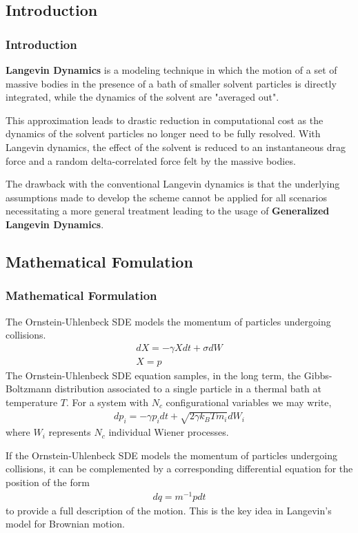 \documentclass[a4paper,8pt]{beamer}
\begin{document}
	\begin{frame}
		\section{Introduction}
		\frametitle{Introduction}
		
		\quad \textbf{Langevin Dynamics} is a modeling technique in which the motion of a set of massive bodies in the presence of a bath of smaller solvent particles is directly integrated, while the dynamics of the solvent are "averaged out".
		
		\quad This approximation leads to drastic reduction in computational cost as the dynamics of the solvent particles no longer need to be fully resolved. With Langevin dynamics, the effect of the solvent is reduced to an instantaneous drag force and a random delta-correlated force felt by the massive bodies.
		
		\quad The drawback with the conventional Langevin dynamics is that the underlying assumptions made to develop the scheme cannot be applied for all scenarios necessitating a more general treatment leading to the usage of \textbf{Generalized Langevin Dynamics}. 
	\end{frame}
	
	\begin{frame}
		\section{Mathematical Fomulation}
		\frametitle{Mathematical Formulation}
		The Ornstein-Uhlenbeck SDE models the momentum of particles undergoing collisions.
		\begin{gather}
			dX = -\gamma X dt + \sigma dW \\
			X = p
		\end{gather}
		The Ornstein-Uhlenbeck SDE equation samples, in the long term, the Gibbs-Boltzmann distribution associated to a single particle in a thermal bath at temperature $T$.
		For a system with $N_{c}$ configurational variables we may write,
		\begin{gather}
			dp_{i} = -\gamma p_{i} dt + \sqrt{2 \gamma k_{B} T m_{i}} dW_{i} 
		\end{gather}
		where $W_{i}$ represents $N_{c}$ individual Wiener processes.
		
		If the Ornstein-Uhlenbeck SDE models the momentum of particles undergoing collisions, it can be complemented by a corresponding differential equation for the position of the form
		\begin{gather}
			dq = m^{-1} p dt
		\end{gather}
		to provide a full description of the motion. This is the key idea in Langevin's model for Brownian motion.
	\end{frame}
\end{document}
